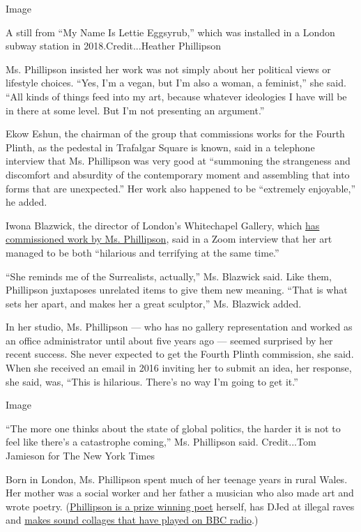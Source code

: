 Image

A still from ``My Name Is Lettie Eggsyrub,'' which was installed in a
London subway station in 2018.Credit...Heather Phillipson

Ms. Phillipson insisted her work was not simply about her political
views or lifestyle choices. ``Yes, I'm a vegan, but I'm also a woman, a
feminist,'' she said. ``All kinds of things feed into my art, because
whatever ideologies I have will be in there at some level. But I'm not
presenting an argument.''

Ekow Eshun, the chairman of the group that commissions works for the
Fourth Plinth, as the pedestal in Trafalgar Square is known, said in a
telephone interview that Ms. Phillipson was very good at ``summoning the
strangeness and discomfort and absurdity of the contemporary moment and
assembling that into forms that are unexpected.'' Her work also happened
to be ``extremely enjoyable,'' he added.

Iwona Blazwick, the director of London's Whitechapel Gallery, which
\href{https://www.whitechapelgallery.org/exhibitions/heather-phillipson/}{has
commissioned work by Ms. Phillipson}, said in a Zoom interview that her
art managed to be both ``hilarious and terrifying at the same time.''

``She reminds me of the Surrealists, actually,'' Ms. Blazwick said. Like
them, Phillipson juxtaposes unrelated items to give them new meaning.
``That is what sets her apart, and makes her a great sculptor,'' Ms.
Blazwick added.

In her studio, Ms. Phillipson --- who has no gallery representation and
worked as an office administrator until about five years ago --- seemed
surprised by her recent success. She never expected to get the Fourth
Plinth commission, she said. When she received an email in 2016 inviting
her to submit an idea, her response, she said, was, ``This is hilarious.
There's no way I'm going to get it.''

Image

``The more one thinks about the state of global politics, the harder it
is not to feel like there's a catastrophe coming,'' Ms. Phillipson said.
Credit...Tom Jamieson for The New York Times

Born in London, Ms. Phillipson spent much of her teenage years in rural
Wales. Her mother was a social worker and her father a musician who also
made art and wrote poetry.
(\href{https://www.nytimes3xbfgragh.onion/2016/02/11/t-magazine/art/heather-phillipson-british-artist.html}{Phillipson
is a prize winning poet} herself, has DJed at illegal raves and
\href{https://www.bbc.co.uk/programmes/m000gdzs}{makes sound collages
that have played on BBC radio}.)


